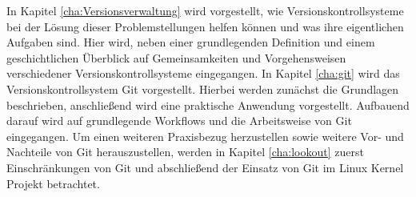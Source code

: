 In Kapitel \ref{cha:Versionsverwaltung} wird vorgestellt, wie
Versionskontrollsysteme bei der Lösung dieser Problemstellungen helfen können
und was ihre eigentlichen Aufgaben sind. Hier wird, neben einer grundlegenden
Definition und einem geschichtlichen Überblick auf Gemeinsamkeiten und
Vorgehensweisen verschiedener Versionskontrollsysteme eingegangen. In Kapitel
\ref{cha:git} wird das Versionskontrollsystem Git vorgestellt. Hierbei werden
zunächst die Grundlagen beschrieben, anschließend wird eine praktische
Anwendung vorgestellt. Aufbauend darauf wird auf grundlegende Workflows und die
Arbeitsweise von Git eingegangen. Um einen weiteren Praxisbezug herzustellen
sowie weitere Vor- und Nachteile von Git herauszustellen, werden in Kapitel
\ref{cha:lookout} zuerst Einschränkungen von Git und abschließend der Einsatz
von Git im Linux Kernel Projekt betrachtet.
